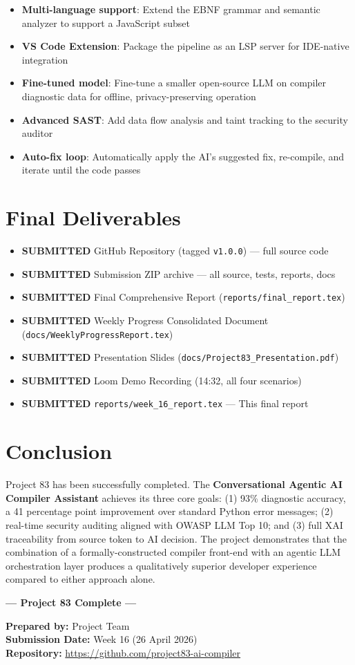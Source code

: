 \documentclass[a4paper,11pt]{article}
\newcommand{\statusgood}[1]{\colorbox{green!20}{\textbf{#1}}}
\begin{document}
\begin{itemize}[leftmargin=*]
    \item \textbf{Multi-language support}: Extend the EBNF grammar and semantic analyzer to support a JavaScript subset
    \item \textbf{VS Code Extension}: Package the pipeline as an LSP server for IDE-native integration
    \item \textbf{Fine-tuned model}: Fine-tune a smaller open-source LLM on compiler diagnostic data for offline, privacy-preserving operation
    \item \textbf{Advanced SAST}: Add data flow analysis and taint tracking to the security auditor
    \item \textbf{Auto-fix loop}: Automatically apply the AI's suggested fix, re-compile, and iterate until the code passes
\end{itemize}

\section{Final Deliverables}

\begin{itemize}[leftmargin=*]
    \item \statusgood{SUBMITTED} GitHub Repository (tagged \texttt{v1.0.0}) --- full source code
    \item \statusgood{SUBMITTED} Submission ZIP archive --- all source, tests, reports, docs
    \item \statusgood{SUBMITTED} Final Comprehensive Report (\texttt{reports/final\_report.tex})
    \item \statusgood{SUBMITTED} Weekly Progress Consolidated Document (\texttt{docs/WeeklyProgressReport.tex})
    \item \statusgood{SUBMITTED} Presentation Slides (\texttt{docs/Project83\_Presentation.pdf})
    \item \statusgood{SUBMITTED} Loom Demo Recording (14:32, all four scenarios)
    \item \statusgood{SUBMITTED} \texttt{reports/week\_16\_report.tex} --- This final report
\end{itemize}

\section{Conclusion}

Project 83 has been successfully completed. The \textbf{Conversational Agentic AI Compiler Assistant} achieves its three core goals: (1) 93\% diagnostic accuracy, a 41 percentage point improvement over standard Python error messages; (2) real-time security auditing aligned with OWASP LLM Top 10; and (3) full XAI traceability from source token to AI decision. The project demonstrates that the combination of a formally-constructed compiler front-end with an agentic LLM orchestration layer produces a qualitatively superior developer experience compared to either approach alone.

\vspace{5mm}
\begin{center}
    \large \textbf{--- Project 83 Complete ---}
\end{center}

\vspace{5mm}
\noindent\textbf{Prepared by:} Project Team \\
\textbf{Submission Date:} Week 16 (26 April 2026) \\
\textbf{Repository:} \url{https://github.com/project83-ai-compiler}
\end{document}
